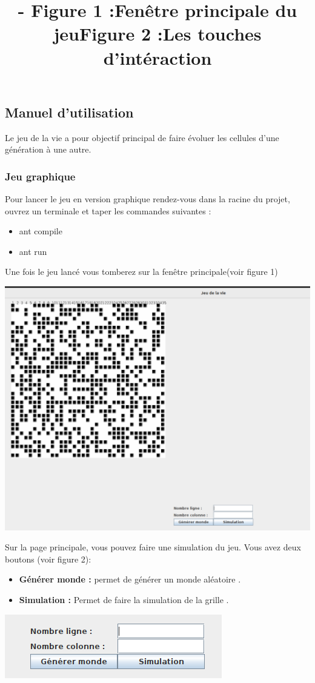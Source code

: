 \documentclass[a4paper,12pt]{article} %
\begin{document}
\subsection{Manuel d'utilisation }  
Le jeu de la vie  a pour objectif principal de faire évoluer les cellules d'une génération à une autre.
\subsubsection{Jeu graphique}
Pour lancer le jeu en version graphique rendez-vous dans la racine du projet, ouvrez  un terminale et taper les commandes suivantes :
\begin{itemize}
\item ant compile 
\item ant run 
\end{itemize}

Une fois le jeu lancé vous tomberez sur la fenêtre principale(voir figure 1)
\begin{center}
\includegraphics[scale=0.4]{./images/AffichageFenetre.png}
\title{- Figure 1 :Fenêtre principale du jeu}
\end{center}
Sur la page principale, vous pouvez faire une simulation du jeu. Vous avez deux boutons (voir figure 2):
\begin{itemize}
\item \textbf{Générer monde :}
permet de générer un monde aléatoire .
\item \textbf{Simulation :}
Permet de faire la simulation de la grille .
\end{itemize}
\begin{center}
\includegraphics[scale=0.6]{./images/bouttons.png}\\
\title{Figure 2 :Les touches d'intéraction}
\end{center}
\end{document}
